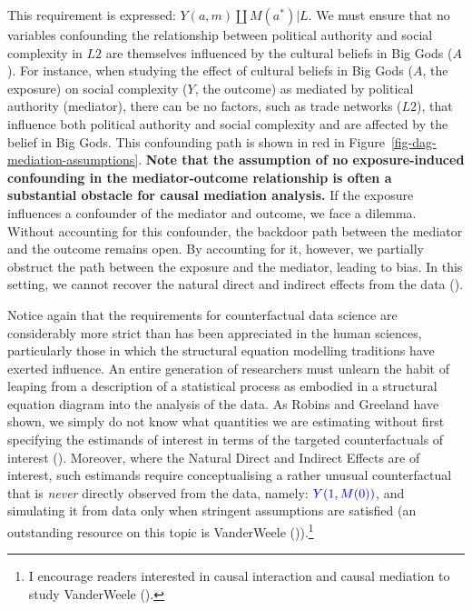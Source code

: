 \documentclass[
  singlecolumn,
  9pt]{article}
\begin{document}
This requirement is expressed: \(Y(a,m) \coprod M(a^*) | L\). We must
ensure that no variables confounding the relationship between political
authority and social complexity in \(L2\) are themselves influenced by
the cultural beliefs in Big Gods (\(A\)). For instance, when studying
the effect of cultural beliefs in Big Gods (\(A\), the exposure) on
social complexity (\(Y\), the outcome) as mediated by political
authority (mediator), there can be no factors, such as trade networks
(\(L2\)), that influence both political authority and social complexity
and are affected by the belief in Big Gods. This confounding path is
shown in red in Figure~\ref{fig-dag-mediation-assumptions}. \textbf{Note
that the assumption of no exposure-induced confounding in the
mediator-outcome relationship is often a substantial obstacle for causal
mediation analysis.} If the exposure influences a confounder of the
mediator and outcome, we face a dilemma. Without accounting for this
confounder, the backdoor path between the mediator and the outcome
remains open. By accounting for it, however, we partially obstruct the
path between the exposure and the mediator, leading to bias. In this
setting, we cannot recover the natural direct and indirect effects from
the data ().

Notice again that the requirements for counterfactual data science are
considerably more strict than has been appreciated in the human
sciences, particularly those in which the structural equation modelling
traditions have exerted influence. An entire generation of researchers
must unlearn the habit of leaping from a description of a statistical
process as embodied in a structural equation diagram into the analysis
of the data. As Robins and Greeland have shown, we simply do not know
what quantities we are estimating without first specifying the estimands
of interest in terms of the targeted counterfactuals of interest
(). Moreover, where
the Natural Direct and Indirect Effects are of interest, such estimands
require conceptualising a rather unusual counterfactual that is
\emph{never} directly observed from the data, namely:
\(\textcolor{blue}{Y(1, M(0))}\), and simulating it from data only when
stringent assumptions are satisfied (an outstanding resource on this
topic is VanderWeele ()).\footnote{I
  encourage readers interested in causal interaction and causal
  mediation to study VanderWeele ().}
\end{document}

